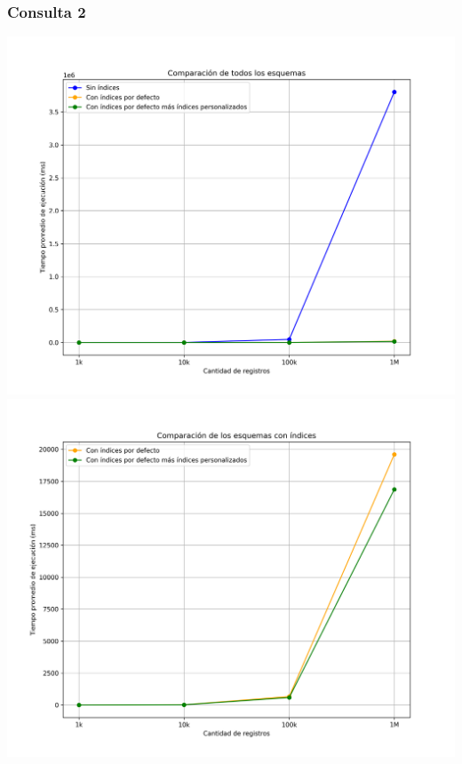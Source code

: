 \subsubsection{Consulta 2}
\begin{center}
	\includegraphics[width=\linewidth, keepaspectratio]{figures/query_2_execution_times_1.png}
	\includegraphics[width=\linewidth, keepaspectratio]{figures/query_2_execution_times_2.png}
\end{center}
